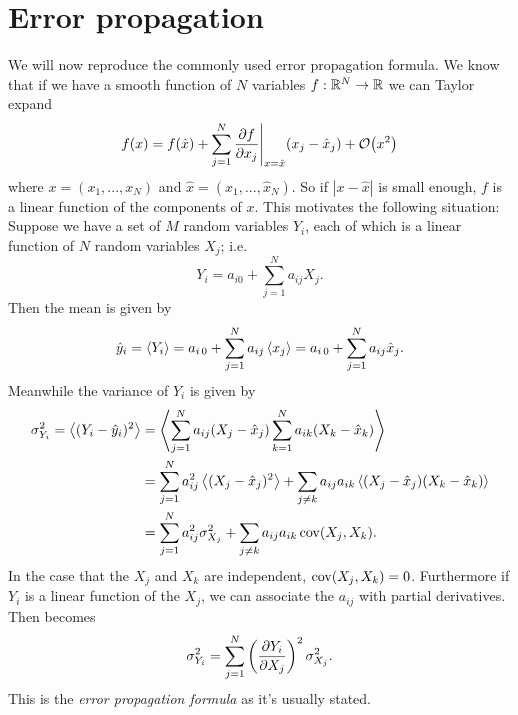 \section{Error propagation}\label{sec:prop}
We will now reproduce the commonly used error propagation formula. We know
that if we have a smooth function of $N$ variables 
$f:\mathbb{R}^N\to\mathbb{R}$ we can Taylor expand
\begin{equation}
  f(x)=f(\hat{x})+\sum_{j=1}^N
        \pdv{f}{x_j}\Bigg|_{x=\hat{x}}(x_j-\hat{x}_j)
        +\order{x^2}
\end{equation}
where $x=(x_1,...,x_N)$ and $\hat{x}=(\hat{x}_1,...,\hat{x}_N)$. So if 
$|x-\hat{x}|$ is small enough, $f$ is a linear function of the components 
of $x$. This motivates the following situation: Suppose we have a set of 
$M$ random variables $Y_i$, each of which is a linear function of $N$ 
random variables $X_j$; i.e.
\begin{equation}\label{eq:lintran}
  Y_i=a_{i0}+\sum_{j=1}^N a_{ij}X_j.
\end{equation}
Then the mean is given by
\begin{equation}
  \hat{y}_i=\ev{Y_i}=a_{i\,0}+\sum_{j=1}^N a_{ij}\ev{x_j}
           =a_{i\,0}+\sum_{j=1}^N a_{ij}\hat{x}_j.
\end{equation}
Meanwhile the variance of $Y_i$ is given by
\begin{equation}\label{eq:linprop}
  \begin{aligned}
    \sigma^2_{Y_i}=\ev{(Y_i-\hat{y}_i)^2}
              &=\ev{\sum_{j=1}^N a_{ij}(X_j-\hat{x}_j)
                   \sum_{k=1}^N a_{ik}(X_k-\hat{x}_k)}\\
              &=\sum_{j=1}^N a_{ij}^2\ev{(X_j-\hat{x}_j)^2}
               +\sum_{j\neq k}a_{ij}a_{ik}
                \ev{(X_j-\hat{x}_j)(X_k-\hat{x}_k)}\\
              &=\sum_{j=1}^N a_{ij}^2\sigma^2_{X_j}
               +\sum_{j\neq k}a_{ij}a_{ik}\Cov(X_j,X_k).
  \end{aligned}
\end{equation}
In the case that the $X_j$ and $X_k$ are independent, $\operatorname{cov}(X_j,X_k)=0$.
Furthermore if $Y_i$ is a linear function of the $X_j$, we 
can associate the $a_{ij}$ with partial derivatives. Then 
 becomes
\begin{equation}\label{eq:errprop}\index{error propagation formula}
  \sigma^2_{Y_i}=
   \sum_{j=1}^N\left(\pdv{Y_i}{X_j}\right)^2\sigma_{X_j}^2.
\end{equation}
This is the {\it error propagation formula} as it's usually stated. 
